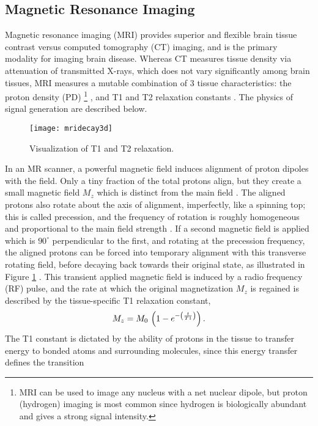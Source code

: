 \subsection{Magnetic Resonance Imaging}\label{ss:mri}
Magnetic resonance imaging (MRI) provides superior and flexible brain tissue contrast
versus computed tomography (CT) imaging, and is the primary modality for imaging brain disease.
Whereas CT measures tissue density via attenuation of transmitted X-rays,
which does not vary significantly among brain tissues,
MRI measures a mutable combination of 3 tissue characteristics: the proton density (PD)%
\footnote{MRI can be used to image any nucleus with a net nuclear dipole,
  but proton (hydrogen) imaging is most common since hydrogen is biologically abundant
  and gives a strong signal intensity.}%
, and T1 and T2 relaxation constants \cite{Pooley2005}.
The physics of signal generation are described below.
\par
\begin{figure}[b]
  \centering\texttt{[image: mridecay3d]}
  \caption{Visualization of T1 and T2 relaxation.}
  \label{fig:mridecay3d}
\end{figure}
In an MR scanner, a powerful magnetic field induces alignment of proton dipoles with the field.
Only a tiny fraction of the total protons align,
but they create a small magnetic field $M_z$ which is distinct from the main field \cite{Bloch1946}.
The aligned protons also rotate about the axis of alignment, imperfectly, like a spinning top;
this is called precession, and the frequency of rotation is roughly homogeneous and proportional
to the main field strength \cite{Bloch1946}.
If a second magnetic field is applied which is $90^{\circ}$ perpendicular to the first,
and rotating at the precession frequency, the aligned protons can be forced into
temporary alignment with this transverse rotating field, before decaying
back towards their original state, as illustrated in Figure \ref{fig:mridecay3d} \cite{Bloch1946}.
This transient applied magnetic field is induced by a radio frequency (RF) pulse,
and the rate at which the original magnetization $M_z$ is regained is described by
the tissue-specific T1 relaxation constant,
\begin{equation}
  M_z = M_0\thinspace\left(1-e^{-\left(\frac{t}{T1}\right)}\right)\label{eq:T1}.
\end{equation}
The T1 constant is dictated by the ability of protons in the tissue to transfer energy
to bonded atoms and surrounding molecules, since this energy transfer defines the transition
